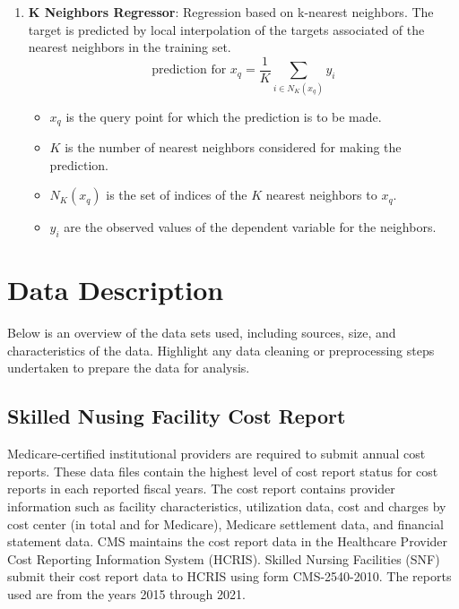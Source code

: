\documentclass{article}
\theoremstyle{mytheoremstyle}
\theoremstyle{mytheoremstyle}
\theoremstyle{myproblemstyle}
\begin{document}
\begin{enumerate}
    \item \textbf{K Neighbors Regressor}: Regression based on k-nearest neighbors. The target is predicted by local interpolation of the targets associated of the nearest neighbors in the training set.
        \[
\text{prediction for } x_q = \frac{1}{K} \sum_{i \in N_K(x_q)} y_i
\]
\begin{itemize}
    \item $x_q$ is the query point for which the prediction is to be made.
    \item $K$ is the number of nearest neighbors considered for making the prediction.
    \item $N_K(x_q)$ is the set of indices of the $K$ nearest neighbors to $x_q$.
    \item $y_i$ are the observed values of the dependent variable for the neighbors.
\end{itemize}
\end{enumerate}



\section{Data Description}

Below is an overview of the data sets used, including sources, size, and characteristics of the data. Highlight any data cleaning or preprocessing steps undertaken to prepare the data for analysis.



\subsection{Skilled Nusing Facility Cost Report}

Medicare-certified institutional providers are required to submit annual cost reports. These data files contain the highest level of cost report status for cost reports in each reported fiscal years. The cost report contains provider information such as facility characteristics, utilization data, cost and charges by cost center (in total and for Medicare), Medicare settlement data, and financial statement data. CMS maintains the cost report data in the Healthcare Provider Cost Reporting Information System (HCRIS). Skilled Nursing Facilities (SNF) submit their cost report data to HCRIS using form CMS-2540-2010. The reports used are from the years 2015 through 2021.
\end{document}
